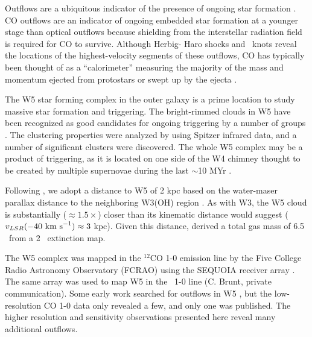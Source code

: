 Outflows are a ubiquitous indicator of the presence of ongoing star formation
\citep{reipurth2001}.  CO outflows are an indicator of ongoing embedded star
formation at a younger stage than optical outflows because shielding from the
interstellar radiation field is required for CO to survive.  Although Herbig-
Haro shocks and \hh\ knots reveal the locations of the highest-velocity
segments of these outflows, CO has typically been thought of as a
``calorimeter'' measuring the majority of the mass and momentum ejected from
protostars or swept up by the ejecta \citep{Bachiller1996}.


The W5 star forming complex in the outer galaxy is a prime location to study
massive star formation and triggering.  The bright-rimmed clouds in W5 have
been recognized as good candidates for ongoing triggering by a number of groups
\citep{lefloch:cometary:1997,thompson:searching:2004,karr:triggered:2003}.  The
clustering properties were analyzed by \citet{koenig:clustered:2008} using
Spitzer infrared data, and a number of significant clusters were discovered.
The whole W5 complex may be a product of triggering, as it is located on one
side of the W4 chimney thought to be created by multiple supernovae during the
last $\sim$10 MYr \citep[][Figure \ref{fig:color_overview}]
{oey:hierarchical:2005}.  

Following \citet{koenig:clustered:2008}, we adopt a distance to W5 of 2 kpc
based on the water-maser parallax distance to the neighboring W3(OH) region
\citep{Hachisuka2006}.  As with W3, the W5 cloud is substantially
($\approx1.5\times$) closer than its kinematic distance would suggest
($v_{LSR}(-40~\textrm{km~s}^{-1})\approx3$ kpc).  Given this distance,
\citet{koenig:clustered:2008} derived a total gas mass of 6.5 \msun\ from
a 2 \um\ extinction map.

The W5 complex was mapped in the $^{12}$CO 1-0 emission line by the Five
College Radio Astronomy Observatory (FCRAO) using the SEQUOIA receiver array
\citep{heyer:ogs:1998}.  The same array was used to map W5 in the \thirteenco\
1-0 line (C. Brunt, private communication).  Some early work searched for
outflows in W5 \citep{bretherton:unbiased:2002}, but the low-resolution CO 1-0
data only revealed a few, and only one was published.  The higher resolution
and sensitivity observations presented here reveal many additional outflows.


